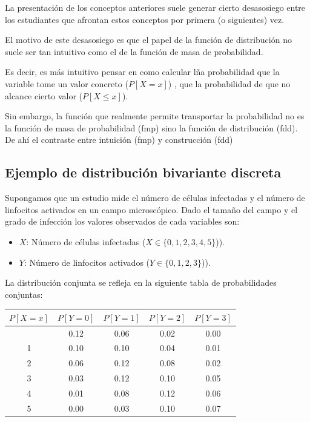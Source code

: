 \documentclass[
  a4paper,
  DIV=11,
  numbers=noendperiod]{scrreprt}
\providecommand{\tightlist}{%
  \setlength{\itemsep}{0pt}\setlength{\parskip}{0pt}}\usepackage{longtable,booktabs,array}
\begin{document}
La presentación de los conceptos anteriores suele generar cierto
desasosiego entre los estudiantes que afrontan estos conceptos por
primera (o siguientes) vez.

El motivo de este desasosiego es que el papel de la función de
distribución no suele ser tan intuitivo como el de la función de masa de
probabilidad.

Es decir, es más intuitivo pensar en como calcular lña probabilidad que
la variable tome un valor concreto (\(P[X=x]\)) , que la probabilidad de
que no alcance cierto valor (\(P[X\leq x]\)).

Sin embargo, la función que realmente permite transportar la
probabilidad no es la función de masa de probabilidad (fmp) sino la
función de distribución (fdd). De ahí el contraste entre intuición (fmp)
y construcción (fdd)

\subsection{Ejemplo de distribución bivariante
discreta}\label{ejemplo-de-distribuciuxf3n-bivariante-discreta}

Supongamos que un estudio mide el número de células infectadas y el
número de linfocitos activados en un campo microscópico. Dado el tamaño
del campo y el grado de infección los valores observados de cada
variables son:

\begin{itemize}
\tightlist
\item
  \(X\): Número de células infectadas (\(X \in \{0, 1, 2, 3, 4, 5\}\))).
\item
  \(Y\): Número de linfocitos activados (\(Y \in \{0, 1, 2, 3\}\))).
\end{itemize}

La distribución conjunta se refleja en la siguiente tabla de
probabilidades conjuntas:

\begin{longtable}[]{@{}ccccc@{}}
\toprule\noalign{}
\(P[X=x]\) & \(P[Y = 0]\) & \(P[Y = 1]\) & \(P[Y = 2]\) &
\(P[Y = 3]\) \\
\midrule\noalign{}
\endhead
\bottomrule\noalign{}
\endlastfoot
0 & 0.12 & 0.06 & 0.02 & 0.00 \\
1 & 0.10 & 0.10 & 0.04 & 0.01 \\
2 & 0.06 & 0.12 & 0.08 & 0.02 \\
3 & 0.03 & 0.12 & 0.10 & 0.05 \\
4 & 0.01 & 0.08 & 0.12 & 0.06 \\
5 & 0.00 & 0.03 & 0.10 & 0.07 \\
\end{longtable}
\end{document}
